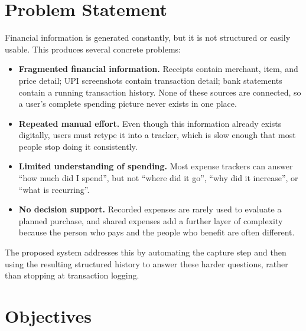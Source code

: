 \documentclass[11pt,a4paper]{article}
\begin{document}

\section{Problem Statement}

Financial information is generated constantly, but it is not structured
or easily usable. This produces several concrete problems:

\begin{itemize}

    \item \textbf{Fragmented financial information.} Receipts contain
    merchant, item, and price detail; UPI screenshots contain
    transaction detail; bank statements contain a running transaction
    history. None of these sources are connected, so a user's complete
    spending picture never exists in one place.

    \item \textbf{Repeated manual effort.} Even though this information
    already exists digitally, users must retype it into a tracker,
    which is slow enough that most people stop doing it consistently.

    \item \textbf{Limited understanding of spending.} Most expense
    trackers can answer ``how much did I spend'', but not ``where did
    it go'', ``why did it increase'', or ``what is recurring''.

    \item \textbf{No decision support.} Recorded expenses are rarely
    used to evaluate a planned purchase, and shared expenses add a
    further layer of complexity because the person who pays and the
    people who benefit are often different.

\end{itemize}

The proposed system addresses this by automating the capture step and
then using the resulting structured history to answer these harder
questions, rather than stopping at transaction logging.


\section{Objectives}
\end{document}
